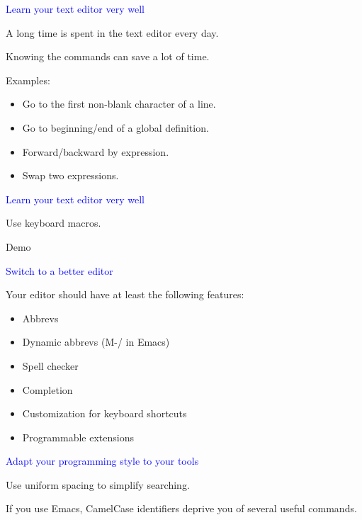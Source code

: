 \documentclass{slides}
\newcommand{\ti}[1]{\begin{center}\Large{\textcolor{blue}{#1}}\end{center}}
\begin{document}
\begin{slide}\ti{Learn your text editor very well}

A long time is spent in the text editor every day.

Knowing the commands can save a lot of time.

Examples:

\begin{itemize}
\item Go to the first non-blank character of a line.
\item Go to beginning/end of a global definition.
\item Forward/backward by expression.
\item Swap two expressions.
\end{itemize}

\vfill\end{slide}
\begin{slide}\ti{Learn your text editor very well}

Use keyboard macros.

Demo

\vfill\end{slide}
\begin{slide}\ti{Switch to a better editor}

Your editor should have at least the following features:

\begin{itemize}
\item Abbrevs
\item Dynamic abbrevs (M-/ in Emacs)
\item Spell checker
\item Completion
\item Customization for keyboard shortcuts
\item Programmable extensions
\end{itemize}

\vfill\end{slide}
\begin{slide}\ti{Adapt your programming style to your tools}

Use uniform spacing to simplify searching.

If you use Emacs, CamelCase identifiers deprive you of several useful
commands.

\vfill\end{slide}
\end{document}
